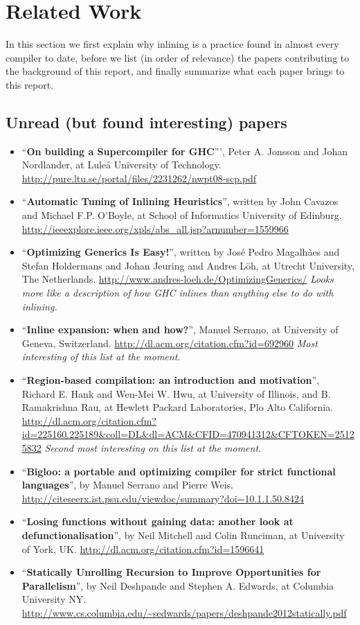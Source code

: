 
\section{Related Work}

In this section we first explain why inlining is a practice found in almost
every compiler to date, before we list (in order of relevance) the
papers contributing to the background of this report, and finally summarize what
each paper brings to this report.

\subsection{Unread (but found interesting) papers}

\begin{itemize}
	\item ``\textbf{On building a Supercompiler for GHC}''', Peter A. Jonsson
and Johan Nordlander, at Luleå University of Technology.
\url{http://pure.ltu.se/portal/files/2231262/nwpt08-scp.pdf}
	\item ``\textbf{Automatic Tuning of Inlining Heuristics}'', written by John
Cavazos and Michael F.P. O'Boyle, at School of Informatics University of
Edinburg.
\url{http://ieeexplore.ieee.org/xpls/abs_all.jsp?arnumber=1559966}
	\item ``\textbf{Optimizing Generics Is Easy!}'', written by José Pedro
Magalhães and Stefan Holdermans and Johan Jeuring and Andres Löh, at Utrecht
University, The Netherlands.
\url{http://www.andres-loeh.de/OptimizingGenerics/}
\textit{Looks more like a description of how GHC inlines than anything else to
do with inlining.}
	\item ``\textbf{Inline expansion: when and how?}'', Manuel Serrano, at
University of Geneva, Switzerland.
\url{http://dl.acm.org/citation.cfm?id=692960}
\textit{Most interesting of this list at the moment.}
	\item ``\textbf{Region-based compilation: an introduction and motivation}'',
Richard E. Hank and Wen-Mei W. Hwu, at University of Illinois, and B.
Ramakrishna Rau, at Hewlett Packard Laboratories, Plo Alto California.
\url{http://dl.acm.org/citation.cfm?id=225160.225189&coll=DL&dl=ACM&CFID=470941312&CFTOKEN=25125832}
\textit{Second most interesting on this list at the moment.}
	\item ``\textbf{Bigloo: a portable and optimizing compiler for strict
functional languages}'', by Manuel Serrano and Pierre Weis.
\url{http://citeseerx.ist.psu.edu/viewdoc/summary?doi=10.1.1.50.8424}
	\item ``\textbf{Losing functions without gaining data: another look at
defunctionalisation}'', by Neil Mitchell and Colin Runciman, at University of
York, UK.
\url{http://dl.acm.org/citation.cfm?id=1596641}
	\item ``\textbf{Statically Unrolling Recursion to Improve Opportunities for
Parallelism}'', by Neil Deshpande and Stephen A. Edwards, at Columbia University
NY.
\url{http://www.cs.columbia.edu/~sedwards/papers/deshpande2012statically.pdf}
\end{itemize}

